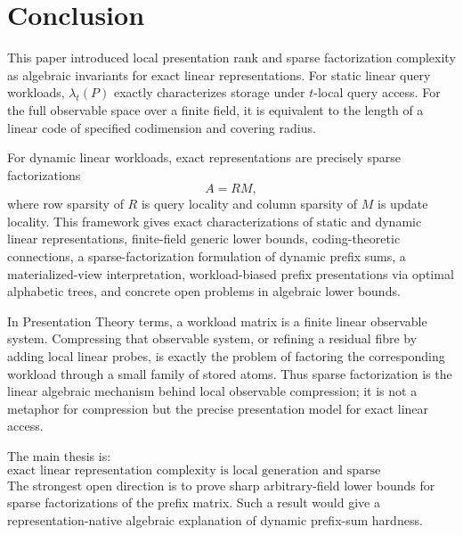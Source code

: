 \documentclass[11pt]{article}
\begin{document}
\section{Conclusion}

This paper introduced local presentation rank and sparse factorization complexity as algebraic invariants for exact linear representations. For static linear query workloads, $\lambda_t(P)$ exactly characterizes storage under $t$-local query access. For the full observable space over a finite field, it is equivalent to the length of a linear code of specified codimension and covering radius.

For dynamic linear workloads, exact representations are precisely sparse factorizations
\[
A=RM,
\]
where row sparsity of $R$ is query locality and column sparsity of $M$ is update locality. This framework gives exact characterizations of static and dynamic linear representations, finite-field generic lower bounds, coding-theoretic connections, a sparse-factorization formulation of dynamic prefix sums, a materialized-view interpretation, workload-biased prefix presentations via optimal alphabetic trees, and concrete open problems in algebraic lower bounds.

In Presentation Theory terms, a workload matrix is a finite linear observable system. Compressing that observable system, or refining a residual fibre by adding local linear probes, is exactly the problem of factoring the corresponding workload through a small family of stored atoms. Thus sparse factorization is the linear algebraic mechanism behind local observable compression; it is not a metaphor for compression but the precise presentation model for exact linear access.

The main thesis is:
\[
\text{exact linear representation complexity is local generation and sparse factorization.}
\]
The strongest open direction is to prove sharp arbitrary-field lower bounds for sparse factorizations of the prefix matrix. Such a result would give a representation-native algebraic explanation of dynamic prefix-sum hardness.
\end{document}
